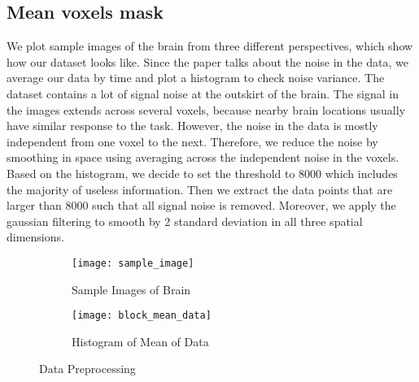 \subsection{Mean voxels mask}

We plot sample images of the brain from three different perspectives, which 
show how our dataset looks like. Since the paper talks about the noise 
in the data, we average our data by time and plot a histogram to check noise 
variance. The dataset contains a lot of signal noise at the outskirt of the 
brain. The signal in the images extends across several voxels, because nearby 
brain locations usually have similar response to the task. However, the noise 
in the data is mostly independent from one voxel to the next. Therefore, we 
reduce the noise by smoothing in space using averaging across the independent 
noise in the voxels. Based on the histogram, we decide to set the threshold to 
8000 which includes the majority of useless information. Then we extract the data 
points that are larger than 8000 such that all signal noise is removed. Moreover, 
we apply the gaussian filtering to smooth by 2 standard deviation in all three spatial 
dimensions.

\begin{figure}[ht]
\centering
\begin{subfigure}{.45\textwidth}
  \texttt{[image: sample\_image]}
  \caption{Sample Images of Brain}
  \label{fig:sub1}
\end{subfigure}%
\begin{subfigure}{.6\textwidth}
  \texttt{[image: block\_mean\_data]}
  \centering
  \caption{Histogram of Mean of Data}
  \label{fig:sub2}
\end{subfigure}
\caption{Data Preprocessing\label{fig:datapre}}
\end{figure}


